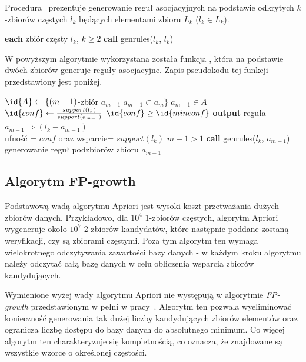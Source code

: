 Procedura~ prezentuje generowanie reguł asocjacyjnych na podstawie odkrytych $k$-zbiorów częstych $l_k$ będących elementami zbioru $L_k$ ($l_k \in L_k$).

\begin{codebox}
		\li \For \textbf{each} zbiór częsty $l_k$, $k \geq 2$ 
		\li \Do
			\textbf{call} genrules($l_k$, $l_k$)
			\End
		\End
\end{codebox}

W powyższym algorytmie wykorzystana została funkcja , która na podstawie dwóch zbiorów generuje reguły asocjacyjne. Zapis pseudokodu tej funkcji przedstawiony jest poniżej.

\begin{codebox}
		\li $\id{A} \gets \lbrace (m-1)$-zbiór $a_{m-1} | a_{m-1} \subset a_m \rbrace$
		\li \For $a_{m-1} \in A$
			\li \Do
			$\id{conf} \gets \frac{support(l_k)}{support(a_{m-1})}$
			\li \If $\id{conf} \geq \id{minconf}$
				\li \Then
						\textbf{output} reguła $a_{m-1} \Rightarrow (l_k - a_{m-1})$ \\ ufność = $conf$ oraz wsparcie= $support(l_k)$
						\li \If $m-1 > 1$ 
							\li \Then
							\textbf{call} genrules($l_k$, $a_{m-1}$) \\ generowanie reguł podzbiorów zbioru $a_{m-1}$
						\End
				\End
			\End
		\End
\end{codebox}

\subsection{Algorytm FP-growth}

Podstawową wadą algorytmu Apriori jest wysoki koszt przetważania dużych zbiorów danych. Przykładowo, dla $10^4$ 1-zbiorów częstych, algorytm Apriori wygeneruje około $10^7$ 2-zbiorów kandydatów, które następnie poddane zostaną weryfikacji, czy są zbiorami częstymi. Poza tym algorytm ten wymaga wielokrotnego odczytywania zawartości bazy danych - w każdym kroku algorytmu należy odczytać całą bazę danych w celu obliczenia wsparcia zbiorów kandydujących.

Wymienione wyżej wady algorytmu Apriori nie występują w algorytmie \emph{FP-growth} przedstawionym w pełni w pracy~\cite{Main:FPgrowth}. Algorytm ten pozwala wyeliminować konieczność generowania tak dużej liczby kandydujących zbiorów elementów oraz ogranicza liczbę dostępu do bazy danych do absolutnego minimum.  Co więcej algorytm ten charakteryzuje się kompletnością, co oznacza, że znajdowane są wszystkie wzorce o określonej częstości.

